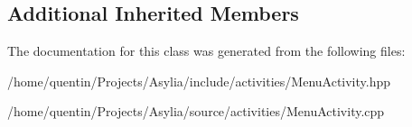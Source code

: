 \subsection*{Additional Inherited Members}


The documentation for this class was generated from the following files\-:\begin{DoxyCompactItemize}
\item 
/home/quentin/\-Projects/\-Asylia/include/activities/Menu\-Activity.\-hpp\item 
/home/quentin/\-Projects/\-Asylia/source/activities/Menu\-Activity.\-cpp\end{DoxyCompactItemize}
